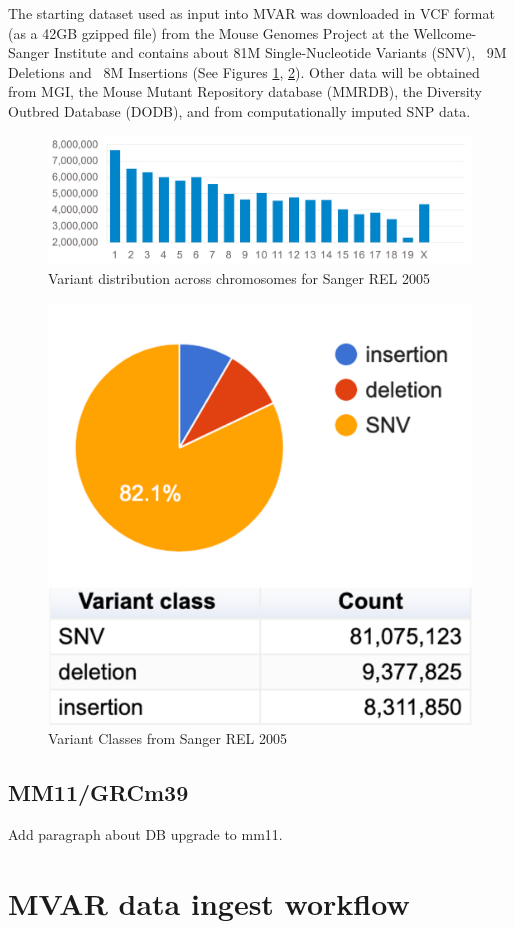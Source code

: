\documentclass{article}
\begin{document}
The starting dataset used as input into MVAR was downloaded in VCF format \cite{vcf} (as a 42GB gzipped file) from the Mouse Genomes Project at the Wellcome-Sanger Institute \cite{mgp} and contains about 81M Single-Nucleotide Variants (SNV), ~9M Deletions and ~8M Insertions (See Figures \ref{fig:var_distrib}, \ref{fig:var_class}). Other data will be obtained from MGI, the Mouse Mutant Repository database (MMRDB), the Diversity Outbred Database (DODB), and from computationally imputed SNP data.

\begin{figure}
\centering
\includegraphics[width=0.75\linewidth]{var_distrib_rel_2005.png}
\caption{\label{fig:var_distrib}Variant distribution across chromosomes for Sanger REL 2005}
\end{figure}

\begin{figure}
\centering
\includegraphics[width=0.5\linewidth]{var_class_rel_2005.png}
\caption{\label{fig:var_class}Variant Classes from Sanger REL 2005}
\end{figure}

\subsection{MM11/GRCm39}

Add paragraph about DB upgrade to mm11.


\section{MVAR data ingest workflow}
\end{document}
